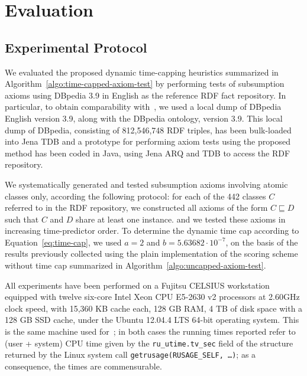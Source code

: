 \documentclass{sig-alternate}
\begin{document}
\section{Evaluation}%
\label{evaluation}

\subsection{Experimental Protocol}

We evaluated the proposed dynamic time-capping heuristics summarized in
Algorithm~\ref{algo:time-capped-axiom-test}
by performing tests of subsumption
axioms using DBpedia 3.9 in English as the reference RDF fact repository.
In particular, to obtain comparability with~\cite{TettamanziFaronZuckerGandon2014ekaw},
we used a local dump of DBpedia English version 3.9, along with the DBpedia ontology, version 3.9.
This local dump of DBpedia, consisting of 812,546,748 RDF triples,
has been bulk-loaded into Jena TDB and a prototype
for performing axiom tests using the proposed method has been coded in Java,
using Jena ARQ and TDB to access the RDF repository.

We systematically generated and tested subsumption axioms
involving atomic classes only, according the following protocol:
for each of the 442 classes $C$ referred to in the RDF repository,
we constructed all axioms of the form $C \sqsubseteq D$ such that $C$ and $D$
share at least one instance. 
and we tested these axioms in increasing time-predictor order.
To determine the dynamic time cap according to Equation~\ref{eq:time-cap},
we used $a = 2$ and $b = 5.63682\cdot 10^{-7}$, on the basis of the
results previously collected using the plain implementation of the scoring scheme
without time cap summarized in Algorithm~\ref{algo:uncapped-axiom-test}.

All experiments have been performed on a Fujitsu CELSIUS workstation equipped
with twelve six-core Intel Xeon CPU E5-2630 v2 processors at 2.60GHz clock speed,
with 15,360 KB cache each, 128 GB RAM,
4 TB of disk space with a 128 GB SSD cache,
under the Ubuntu  12.04.4 LTS 64-bit operating system.
This is the same machine used for~\cite{TettamanziFaronZuckerGandon2014ekaw};
in both cases the running times reported refer to (user + system) CPU time
given by the \texttt{ru\_utime.tv\_sec} field of the structure returned by
the Linux system call \texttt{getrusage(RUSAGE\_SELF, \dots)};
as a consequence, the times are commensurable.
\end{document}
